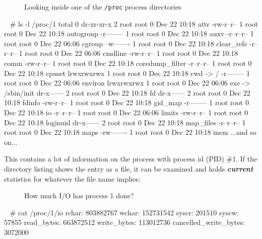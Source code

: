\documentclass[10pt,american,]{book}
\newenvironment{Shaded}{\begin{snugshade}}{\end{snugshade}}
\newcommand{\KeywordTok}[1]{\textcolor[rgb]{0.13,0.29,0.53}{\textbf{{#1}}}}
\newcommand{\CommentTok}[1]{\textcolor[rgb]{0.56,0.35,0.01}{\textit{{#1}}}}
\newcommand{\NormalTok}[1]{{#1}}
\numberwithin{figure}{chapter}
\DeclareRobustCommand{\drcap}[1]{\begin{figure}[H]\caption{#1}\end{figure}}
\renewcommand{\KeywordTok}[1]{{#1}}
\renewcommand{\CommentTok}[1]{{#1}}
\renewcommand{\NormalTok}[1]{{#1}}
\begin{document}
\drcap{Looking inside one of the \texttt{/proc} process directories}

\begin{Shaded}
\begin{Highlighting}[]
\KeywordTok{~} \CommentTok{# ls -l /proc/1}
\KeywordTok{total} \NormalTok{0}
\KeywordTok{dr-xr-xr-x} \NormalTok{2 root root 0 Dec 22 10:18 attr}
\KeywordTok{-rw-r--r--} \NormalTok{1 root root 0 Dec 22 10:18 autogroup}
\KeywordTok{-r--------} \NormalTok{1 root root 0 Dec 22 10:18 auxv}
\KeywordTok{-r--r--r--} \NormalTok{1 root root 0 Dec 22 06:06 cgroup}
\KeywordTok{--w-------} \NormalTok{1 root root 0 Dec 22 10:18 clear_refs}
\KeywordTok{-r--r--r--} \NormalTok{1 root root 0 Dec 22 06:06 cmdline}
\KeywordTok{-rw-r--r--} \NormalTok{1 root root 0 Dec 22 10:18 comm}
\KeywordTok{-rw-r--r--} \NormalTok{1 root root 0 Dec 22 10:18 coredump_filter}
\KeywordTok{-r--r--r--} \NormalTok{1 root root 0 Dec 22 10:18 cpuset}
\KeywordTok{lrwxrwxrwx} \NormalTok{1 root root 0 Dec 22 10:18 cwd -}\KeywordTok{>} \NormalTok{/}
\KeywordTok{-r--------} \NormalTok{1 root root 0 Dec 22 06:06 environ}
\KeywordTok{lrwxrwxrwx} \NormalTok{1 root root 0 Dec 22 06:06 exe -}\KeywordTok{>} \NormalTok{/sbin/init}
\KeywordTok{dr-x------} \NormalTok{2 root root 0 Dec 22 10:18 fd}
\KeywordTok{dr-x------} \NormalTok{2 root root 0 Dec 22 10:18 fdinfo}
\KeywordTok{-rw-r--r--} \NormalTok{1 root root 0 Dec 22 10:18 gid_map}
\KeywordTok{-r--------} \NormalTok{1 root root 0 Dec 22 10:18 io}
\KeywordTok{-r--r--r--} \NormalTok{1 root root 0 Dec 22 06:06 limits}
\KeywordTok{-rw-r--r--} \NormalTok{1 root root 0 Dec 22 10:18 loginuid}
\KeywordTok{dr-x------} \NormalTok{2 root root 0 Dec 22 10:18 map_files}
\KeywordTok{-r--r--r--} \NormalTok{1 root root 0 Dec 22 10:18 maps}
\KeywordTok{-rw-------} \NormalTok{1 root root 0 Dec 22 10:18 mem}
\KeywordTok{...and} \NormalTok{so on...}
\end{Highlighting}
\end{Shaded}

This contains a lot of information on the process with process id (PID)
\#1. If the directory listing shows the entry as a file, it can be
examined and holds \textbf{\emph{current}} statistics for whatever the
file name implies:

\drcap{How much I/O has process 1 done?}

\begin{Shaded}
\begin{Highlighting}[]
\KeywordTok{~} \CommentTok{# cat /proc/1/io}
\KeywordTok{rchar}\NormalTok{: 803882767}
\KeywordTok{wchar}\NormalTok{: 152731542}
\KeywordTok{syscr}\NormalTok{: 201510}
\KeywordTok{syscw}\NormalTok{: 57855}
\KeywordTok{read_bytes}\NormalTok{: 663872512}
\KeywordTok{write_bytes}\NormalTok{: 113012736}
\KeywordTok{cancelled_write_bytes}\NormalTok{: 3072000}
\end{Highlighting}
\end{Shaded}
\end{document}
